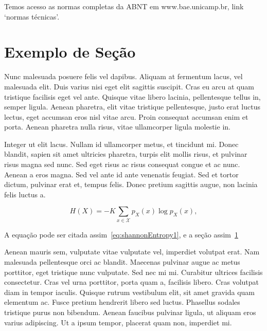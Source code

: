 Temos acesso as normas completas da ABNT em  www.bae.unicamp.br, link ‘normas técnicas’.


\section{Exemplo de Se\c{c}\~{a}o}
\label{sec:sec01}

Nunc malesuada posuere felis vel dapibus. Aliquam at fermentum lacus, vel malesuada elit. Duis varius nisi eget elit sagittis suscipit. Cras eu arcu at quam tristique facilisis eget vel ante. Quisque vitae libero lacinia, pellentesque tellus in, semper ligula. Aenean pharetra, elit vitae tristique pellentesque, justo erat luctus lectus, eget accumsan eros nisl vitae arcu. Proin consequat accumsan enim et porta. Aenean pharetra nulla risus, vitae ullamcorper ligula molestie in.

Integer ut elit lacus. Nullam id ullamcorper metus, et tincidunt mi. Donec blandit, sapien sit amet ultricies pharetra, turpis elit mollis risus, et pulvinar risus magna sed nunc. Sed eget risus ac risus consequat congue et ac nunc. Aenean a eros magna. Sed vel ante id ante venenatis feugiat. Sed et tortor dictum, pulvinar erat et, tempus felis. Donec pretium sagittis augue, non lacinia felis luctus a.

\begin{equation}
H(X) =-K\sum_{x\in\mathcal{X}} p_X(x)\log p_X(x),
\label{eq:shannonEntropy1}
\end{equation}

A equa\c{c}\~{a}o pode ser citada assim~\eqref{eq:shannonEntropy1}, e a se\c{c}\~{a}o assim~\ref{sec:sec01}

Aenean mauris sem, vulputate vitae vulputate vel, imperdiet volutpat erat. Nam malesuada pellentesque orci ac blandit. Maecenas pulvinar augue ac metus porttitor, eget tristique nunc vulputate. Sed nec mi mi. Curabitur ultrices facilisis consectetur. Cras vel urna porttitor, porta quam a, facilisis libero. Cras volutpat diam in tempor iaculis. Quisque rutrum vestibulum elit, sit amet gravida quam elementum ac. Fusce pretium hendrerit libero sed luctus. Phasellus sodales tristique purus non bibendum. Aenean faucibus pulvinar ligula, ut aliquam eros varius adipiscing. Ut a ipsum tempor, placerat quam non, imperdiet mi.


